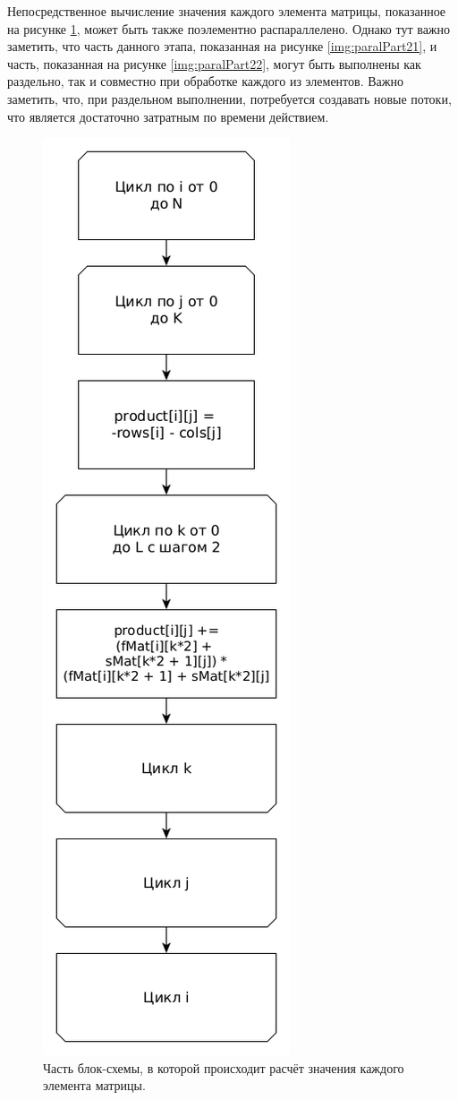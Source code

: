 \documentclass[12pt]{report}
\begin{document}
Непосредственное вычисление значения каждого элемента матрицы, показанное на рисунке \ref{img:paralPart2}, может быть также поэлементно распараллелено. Однако тут важно заметить, что часть данного этапа, показанная на рисунке \ref{img:paralPart21}, и часть, показанная на рисунке \ref{img:paralPart22}, могут быть выполнены как раздельно, так и совместно при обработке каждого из элементов. Важно заметить, что, при раздельном выполнении, потребуется создавать новые потоки, что является достаточно затратным по времени действием.
\begin{figure}
\begin{center}
\includegraphics[scale=0.4]{inc/img/paralPart2.png}
\captionsetup{justification=centering}
	\caption{Часть блок-схемы, в которой происходит расчёт значения каждого элемента матрицы.}
	\label{img:paralPart2}	
\end{center}
\end{figure}
\end{document}
